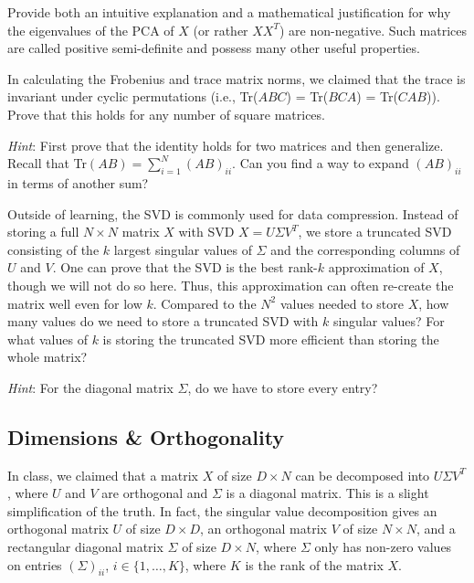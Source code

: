 \problem[4] Provide both an intuitive explanation and a mathematical justification for why the eigenvalues of the PCA of $X$ (or rather $XX^T$) are non-negative. Such matrices are called positive semi-definite and possess many other useful properties.

\begin{solution}
  \end{solution}

\problem[5] In calculating the Frobenius and trace matrix norms, we claimed that the trace is invariant under cyclic permutations (i.e., Tr($ABC$) = Tr($BCA$) = Tr($CAB$)). Prove that this holds for any number of square matrices.

\textit{Hint}: First prove that the identity holds for two matrices and then generalize. Recall that Tr$(AB) = \sum_{i=1}^{N}(AB)_{ii}$. Can you find a way to expand $(AB)_{ii}$ in terms of another sum?

\begin{solution}
  \end{solution}

\problem[3] Outside of learning, the SVD is commonly used for data compression. Instead of storing a full $N \times N$ matrix $X$ with SVD $X = U\Sigma V^T$, we store a truncated SVD consisting of the $k$ largest singular values of $\Sigma$ and the corresponding columns of $U$ and $V$. One can prove that the SVD is the best rank-$k$ approximation of $X$, though we will not do so here. Thus, this approximation can often re-create the matrix well even for low $k$. Compared to the $N^2$ values needed to store $X$, how many values do we need to store a truncated SVD with $k$ singular values? For what values of $k$ is storing the truncated SVD more efficient than storing the whole matrix?

\textit{Hint}: For the diagonal matrix $\Sigma$, do we have to store every entry?

\begin{solution}
  \end{solution}

\subsection{Dimensions \& Orthogonality} In class, we claimed that a matrix $X$ of size $D \times N$ can be decomposed into $U\Sigma V^T$, where $U$ and $V$ are orthogonal and $\Sigma$ is a diagonal matrix. This is a slight simplification of the truth. In fact, the singular value decomposition gives an orthogonal matrix $U$ of size $D \times D$, an orthogonal matrix $V$ of size $N \times N$, and a rectangular diagonal matrix $\Sigma$ of size $D \times N$, where $\Sigma$ only has non-zero values on entries $(\Sigma)_{ii}$, $i \in \{1, \ldots, K\}$, where $K$ is the rank of the matrix $X$. 

